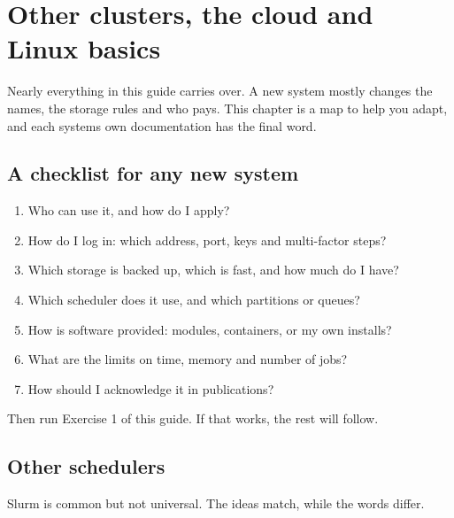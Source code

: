\chapter{Other clusters, the cloud and Linux basics}
\label{ch:beyond}

Nearly everything in this guide carries over. A new system mostly changes the names, the storage rules and who pays. This chapter is a map to help you adapt, and each system\textquotesingle s own documentation has the final word.

\section{A checklist for any new system}\label{a-checklist-for-any-new-system}

\begin{enumerate}
\def\labelenumi{\arabic{enumi}.}
\tightlist
\item
  Who can use it, and how do I apply?
\item
  How do I log in: which address, port, keys and multi-factor steps?
\item
  Which storage is backed up, which is fast, and how much do I have?
\item
  Which scheduler does it use, and which partitions or queues?
\item
  How is software provided: modules, containers, or my own installs?
\item
  What are the limits on time, memory and number of jobs?
\item
  How should I acknowledge it in publications?
\end{enumerate}

Then run Exercise 1 of this guide. If that works, the rest will follow.

\section{Other schedulers}\label{other-schedulers}

Slurm is common but not universal. The ideas match, while the words differ.

